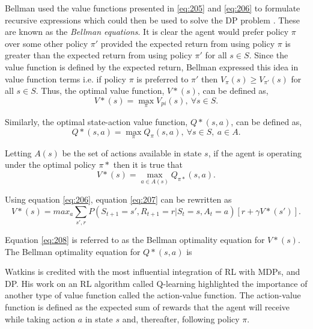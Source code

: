 Bellman used the value functions presented in \ref{eq:205} and \ref{eq:206} to formulate recursive expressions which could then be used to solve the DP problem \cite{Bellm1957}. These are known as the \textit{Bellman equations}. It is clear the agent would prefer policy $\pi$ over some other policy $\pi'$ provided the expected return from using policy $\pi$ is greater than the expected return from using policy $\pi'$ for all $s \in S$. Since the value function is defined by the expected return, Bellman expressed this idea in value function terms i.e. if policy $\pi$ is preferred to $\pi'$ then $V_{\pi}(s) \geq V_{\pi'}(s)$ for all $s \in S$. Thus, the optimal value function, $V*(s)$, can be defined as,
\begin{equation}
	V*(s) = \max_{\pi} V_{pi}(s), \ \forall s \in S.
\end{equation}

Similarly, the optimal state-action value function, $Q*(s,a)$, can be defined as,
\begin{equation}
	Q*(s,a) = \max_{\pi} Q_{\pi}(s,a), \ \forall s \in S, \ a \in A.
\end{equation}

Letting $A(s)$ be the set of actions available in state $s$, if the agent is operating under the optimal policy $\pi*$ then it is true that
\begin{equation}
	V*(s) = \max_{a \in A(s)} Q_{\pi*}(s,a). \label{eq:207}
\end{equation}

Using equation \ref{eq:206}, equation \ref{eq:207} can be rewritten as
\begin{equation}
	V*(s) = max_{a} \sum_{s',r}P(S_{t+1} = s', R_{t+1} = r | S_t = s, A_t = a)[r + \gamma V*(s')]. \label{eq:208}
\end{equation}  

Equation \ref{eq:208} is referred to as the Bellman optimality equation for $V*(s)$. The Bellman optimality equation for $Q*(s,a)$ is

Watkins is credited with the most influential integration of RL with MDPs, and DP. His work on an RL algorithm called Q-learning highlighted the importance of another type of value function called the action-value function. The action-value function is defined as the expected sum of rewards that the agent will receive while taking action $a$ in state $s$ and, thereafter, following policy $\pi$.






